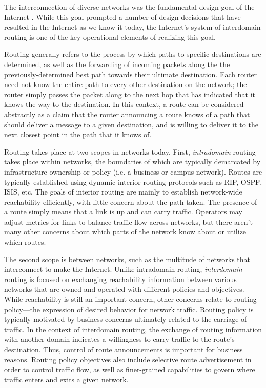 The interconnection of diverse networks was the fundamental design goal of the Internet \cite{Design Philosophies of the DARPA Internet Protocols}. While this goal prompted a number of design decisions that have resulted in the Internet as we know it today, the Internet's system of interdomain routing is one of the key operational elements of realizing this goal.

Routing generally refers to the process by which paths to specific destinations are determined, as well as the forwarding of incoming packets along the the previously-determined best path towards their ultimate destination. Each router need not know the entire path to every other destination on the network; the router simply passes the packet along to the next hop that has indicated that it knows the way to the destination. In this context, a route can be considered abstractly as a claim that the router announcing a route knows of a path that should deliver a message to a given destination, and is willing to deliver it to the next closest point in the path that it knows of.

Routing takes place at two scopes in networks today. First, \emph{intradomain} routing takes place within networks, the boundaries of which are typically demarcated by infrastructure ownership or policy (i.e. a business or campus network). Routes are typically established using dynamic interior routing protocols such as RIP, OSPF, ISIS, etc. The goals of interior routing are mainly to establish network-wide reachability efficiently, with little concern about the path taken. The presence of a route simply means that a link is up and can carry traffic. Operators may adjust metrics for links to balance traffic flow across networks, but there aren't many other concerns about which parts of the network know about or utilize which routes.

The second scope is between networks, such as the multitude of networks that interconnect to make the Internet. Unlike intradomain routing, \emph{interdomain} routing is focused on exchanging reachability information between various networks that are owned and operated with different policies and objectives. While reachability is still an important concern, other concerns relate to routing policy---the expression of desired behavior for network traffic. Routing policy is typically motivated by business concerns ultimately related to the carriage of traffic. In the context of interdomain routing, the exchange of routing information with another domain indicates a willingness to carry traffic to the route's destination. Thus, control of route announcements is important for business reasons. Routing policy objectives also include selective route advertisement in order to control traffic flow, as well as finer-grained capabilities to govern where traffic enters and exits a given network.

